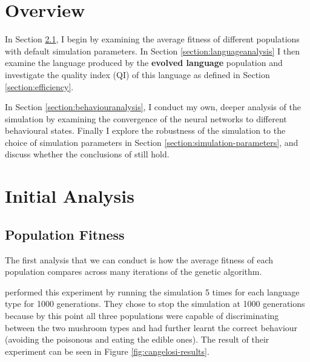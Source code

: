 \documentclass[12pt,a4paper,twoside,openright]{report}
\begin{document}
\section{Overview}

In Section \ref{section:popfit}, I begin by examining the average fitness of different populations with default simulation parameters. In Section \ref{section:languageanalysis} I then examine the language produced by the {\bf evolved language} population and investigate the quality index (QI) of this language as defined in Section \ref{section:efficiency}. 

In Section \ref{section:behaviouranalysis}, I conduct my own, deeper analysis of the simulation by examining the convergence of the neural networks to different behavioural states. Finally I explore the robustness of the simulation to the choice of simulation parameters in Section \ref{section:simulation-parameters}, and discuss whether the conclusions of \citet{Cangelosi1998} still hold.

\section{Initial Analysis}

\subsection{Population Fitness}\label{section:popfit}

 

 
The first analysis that we can conduct is how the average fitness of each population compares across many iterations of the genetic algorithm.

\citet{Cangelosi1998} performed this experiment by running the simulation 5 times for each language type for 1000 generations. They chose to stop the simulation at 1000 generations because by this point all three populations were capable of discriminating between the two mushroom types and had further learnt the correct behaviour (avoiding the poisonous and eating the edible ones). The result of their experiment can be seen in Figure \ref{fig:cangelosi-results}.
\end{document}
